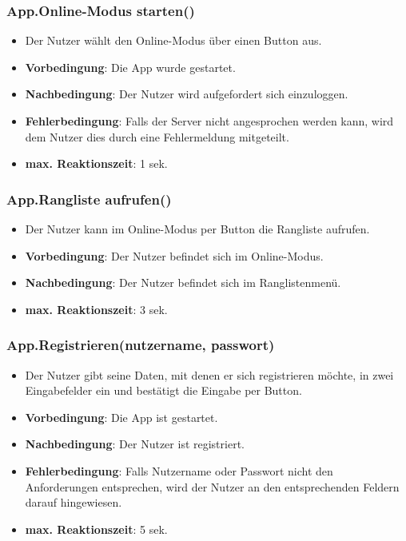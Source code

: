 \documentclass[fontsize=12pt,paper=a4,twoside]{scrartcl}
\begin{document}
\subsubsection{App.Online-Modus starten()}
\begin{itemize}
\item Der Nutzer wählt den Online-Modus über einen Button aus.
\item \textbf{Vorbedingung}: Die App wurde gestartet.
\item \textbf{Nachbedingung}: Der Nutzer wird aufgefordert sich einzuloggen.
\item \textbf{Fehlerbedingung}: Falls der Server nicht angesprochen werden kann, wird dem Nutzer dies durch eine Fehlermeldung mitgeteilt.
\item \textbf{max. Reaktionszeit}: 1 sek.
\end{itemize}

\subsubsection{App.Rangliste aufrufen()}
\begin{itemize}
\item Der Nutzer kann im Online-Modus per Button die Rangliste aufrufen.
\item \textbf{Vorbedingung}: Der Nutzer befindet sich im Online-Modus.
\item \textbf{Nachbedingung}: Der Nutzer befindet sich im Ranglistenmenü. 
\item \textbf{max. Reaktionszeit}: 3 sek.
\end{itemize}

\subsubsection{App.Registrieren(nutzername, passwort)}
\begin{itemize}
\item Der Nutzer gibt seine Daten, mit denen er sich registrieren möchte, in zwei Eingabefelder ein und bestätigt die Eingabe per Button.
\item \textbf{Vorbedingung}: Die App ist gestartet.
\item \textbf{Nachbedingung}: Der Nutzer ist registriert.
\item \textbf{Fehlerbedingung}: Falls Nutzername oder Passwort nicht den Anforderungen entsprechen, wird der Nutzer an den entsprechenden Feldern darauf hingewiesen.
\item \textbf{max. Reaktionszeit}: 5 sek.
\end{itemize}
\end{document}
